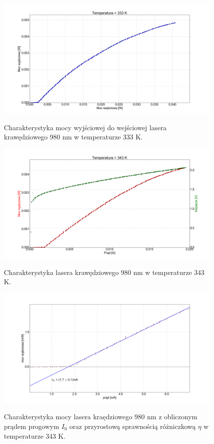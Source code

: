 \documentclass[a4paper, portrait,12pt]{report}
\begin{document}
\clearpage
\begin{figure}
\center
  \includegraphics[scale=0.30]{plot980/temp_60_power.png}
  \label{rys1}
  \caption{Charakterystyka mocy wyjściowej do wejściowej lasera krawędziowego 980 nm w temperaturze 333 K.} 
\end{figure}



\begin{figure}
\center
  \includegraphics[scale=0.30]{plot980/temp_70_IVL.png}
  \label{rys1}
  \caption{Charakterystyka lasera krawędziowego 980 nm w temperaturze 343 K.} 
\end{figure}


\begin{figure}
\center
  \includegraphics[scale=0.30]{plot980/temp_70_fit.png}
  \label{rys1}
  \caption{Charakterystyka mocy lasera kraędziowego 980 nm z obliczonym prądem progowym $I_0$ oraz przyrostową sprawnością różniczkową $\eta$ w temperaturze 343 K.} 
\end{figure}
\end{document}
